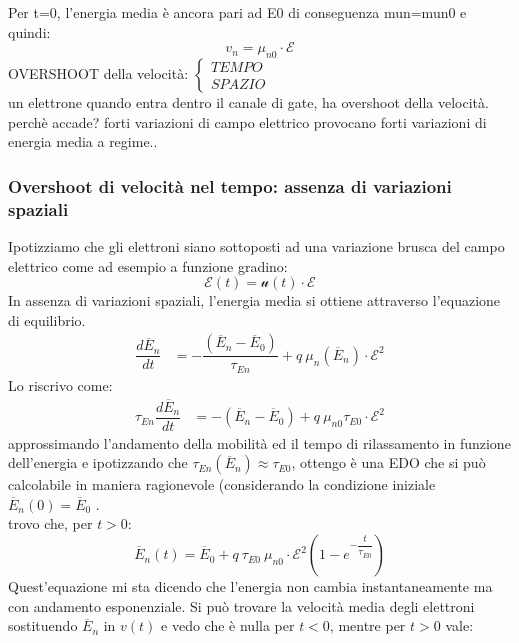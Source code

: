 Per t=0, l'energia media è ancora pari ad E0 di conseguenza mun=mun0 e quindi:
\begin{equation}
    v_n=\mu_{n0}\cdot \mathcal{E}
\end{equation}
OVERSHOOT della velocità:
$\begin{cases}
    TEMPO\\
    SPAZIO
\end{cases}$\\
un elettrone quando entra dentro il canale di gate, ha overshoot della velocità.
perchè accade?
forti variazioni di campo elettrico provocano forti variazioni di energia media a regime..
\subsubsection{Overshoot di velocità nel tempo: assenza di variazioni spaziali}
Ipotizziamo che gli elettroni siano sottoposti ad una variazione brusca del campo elettrico come ad esempio a funzione gradino:
%
\begin{equation}
    \mathcal{E}(t)=\mathcal{u}(t) \cdot \mathcal{E}
\end{equation}
%
In assenza di variazioni spaziali, l'energia media si ottiene attraverso l'equazione di equilibrio.
%
\begin{align}
     \dfrac{d\overline{E}_n}{dt}&=-\dfrac{(\overline{E}_n-\overline{E}_0)}{\tau_{En}}+q\ \mu_n(\overline{E}_n) \cdot \mathcal{E}^2 
\end{align}
Lo riscrivo come:
\begin{align}
      \tau_{En}\dfrac{d\overline{E}_n}{dt}&=-(\overline{E}_n-\overline{E}_0)+q\ \mu_{n0}\tau_{E0} \cdot \mathcal{E}^2
\end{align}
%
approssimando l'andamento della mobilità ed il tempo di rilassamento in funzione dell'energia e ipotizzando che $\tau_{En}(\overline{E}_n) \approx \tau_{E0}$, ottengo è una EDO che si può calcolabile in maniera ragionevole (considerando la condizione iniziale $\overline{E}_n(0) =\overline{E}_0$ .\\
trovo che, per $t>0$:
%
\begin{equation}
    \overline{E}_n (t) = \overline{E}_{0} + q \ \tau_{E0}\ \mu_{n0} \cdot \mathcal{E}^2 \left( 1-e^{-\dfrac{t}{\tau_{E0}}}\right)
\end{equation}
%
Quest'equazione mi sta dicendo che l'energia non cambia instantaneamente ma con andamento esponenziale.
Si può trovare la velocità media degli elettroni sostituendo $\overline{E}_n$ in $v(t)$ e vedo che è nulla per $t<0$, mentre per $t>0$ vale:
